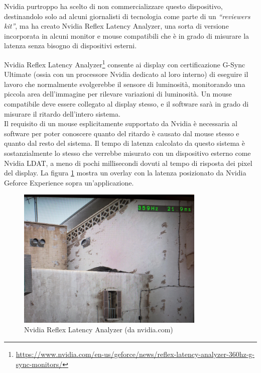 Nvidia purtroppo ha scelto di non commercializzare questo dispositivo, destinandolo solo ad alcuni giornalisti di tecnologia come parte di un \textit{``reviewers kit''}, ma ha creato Nvidia Reflex Latency Analyzer, una sorta di versione incorporata in alcuni monitor e mouse compatibili che è in grado di misurare la latenza senza bisogno di dispositivi esterni.

Nvidia Reflex Latency Analyzer\footnote{\url{https://www.nvidia.com/en-us/geforce/news/reflex-latency-analyzer-360hz-g-sync-monitors/}} consente ai display con certificazione G-Sync Ultimate (ossia con un processore Nvidia dedicato al loro interno) di eseguire il lavoro che normalmente svolgerebbe il sensore di luminosità, monitorando una piccola area dell'immagine per rilevare variazioni di luminosità. Un mouse compatibile deve essere collegato al display stesso, e il software sarà in grado di misurare il ritardo dell'intero sistema.\\
Il requisito di un mouse esplicitamente supportato da Nvidia è necessaria al software per poter conoscere quanto del ritardo è causato dal mouse stesso e quanto dal resto del sistema. Il tempo di latenza calcolato da questo sistema è sostanzialmente lo stesso che verrebbe misurato con un dispositivo esterno come Nvidia LDAT, a meno di pochi millisecondi dovuti al tempo di risposta dei pixel del display. La figura \ref{fig:nvreflex_example} mostra un overlay con la latenza posizionato da Nvidia Geforce Experience sopra un'applicazione.

\begin{figure}[h!]
	\centering
	\includegraphics[width=0.8\textwidth]{StatoDellArte_files/nvreflex_example.jpg}
	\caption{Nvidia Reflex Latency Analyzer (da nvidia.com)}
	\label{fig:nvreflex_example}
\end{figure}

